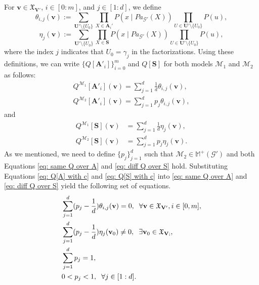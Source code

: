 \documentclass[accepted]{uai2022}
\newcommand{\Pa}[2]{\textit{Pa}_{#2}(#1)}
\newcommand{\V}[0]{\mathbf{V}}
\newcommand{\U}[0]{\mathbf{U}}
\newcommand{\A}[0]{\mathbf{A}}
\newcommand{\G}[0]{\mathcal{G}}
\newcommand{\M}[0]{\mathcal{M}}
\newcommand{\dom}[1]{\mathfrak{X}_{#1}}
\begin{document}
    For $\mathbf{v} \in \dom{\V'}$, $i\in [0:m]$, and $j\in [1:d]$, we define
    \begin{equation*}
        \theta_{i, j}(\mathbf{v}) :=\! \sum_{\U' \setminus \{U_0\}} \prod_{X \in \A_i'} P(x \mid \Pa{X}{\G'})\! \prod_{U\in \U' \setminus \{U_0\}}\! P(u),
    \end{equation*}
    \begin{equation*}
        \eta_j(\mathbf{v}) :=\! \sum_{\U'\setminus \{U_0\}} \prod_{X \in \mathbf{S}} P(x \mid \Pa{X}{\G'})\! \prod_{U\in \U'\setminus \{U_0\}}\! P(u),
    \end{equation*}
    where the index $j$ indicates that $U_0=\gamma_j$ in the factorizations. 
    Using these definitions, we can write $\{Q[\A'_i]\}_{i=0}^m$ and $Q[\textbf{S}]$ for both models $\M_1$ and $\M_2$ as follows:
    \begin{equation} \label{eq: Q[A] with c}
    \begin{split}
        Q^{\M_1}[\mathbf{A}'_i](\mathbf{v}) 
        = \sum_{j=1}^d \frac{1}{d} \theta_{i,j}(\mathbf{v}), \\
        Q^{\M_2}[\mathbf{A}'_i](\mathbf{v}) 
        = \sum_{j=1}^d p_j \theta_{i,j}(\mathbf{v}),
    \end{split}
    \end{equation}
    and
    \begin{equation} \label{eq: Q[S] with c}
    \begin{split}
        Q^{\M_1}[\mathbf{S}](\mathbf{v}) 
        &= \sum_{j=1}^d \frac{1}{d} \eta_j(\mathbf{v}), \\
        Q^{\M_2}[\mathbf{S}](\mathbf{v}) 
        &= \sum_{j=1}^d p_j \eta_j(\mathbf{v}).
    \end{split}
    \end{equation}
    As we mentioned, we need to define $\{p_j\}_{j=1}^d$ such that $\M_2 \in \mathbb{M^+(\G')}$ and both Equations \eqref{eq: same Q over A} and \eqref{eq: diff Q over S} hold.
    Substituting Equations \eqref{eq: Q[A] with c} and \eqref{eq: Q[S] with c} into \eqref{eq: same Q over A} and \eqref{eq: diff Q over S} yield the following set of equations.
    \begin{equation} \label{eq: linear system 1}
    \begin{split}
        &\sum_{j=1}^d (p_j - \frac{1}{d}) \theta_{i,j}(\mathbf{v}) =0, \hspace{0.2cm}\forall \mathbf{v} \in \dom{\V'}, i\in [0,m],\\
        &\sum_{j=1}^d (p_j - \frac{1}{d}) \eta_j(\mathbf{v}_0) \neq 0, \hspace{0.2cm} \exists \mathbf{v}_0 \in \dom{\V;},\\
        & \sum_{j=1}^d p_j = 1,\\
        & 0<p_j<1, \hspace{0.2cm} \forall j \in [1:d].
    \end{split}
    \end{equation}
\end{document}
